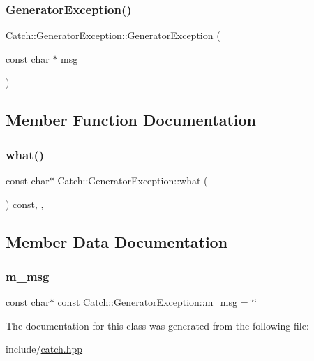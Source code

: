 \subsubsection{\texorpdfstring{GeneratorException()}{GeneratorException()}}
{\footnotesize\ttfamily Catch\+::\+Generator\+Exception\+::\+Generator\+Exception (\begin{DoxyParamCaption}\item[{const char $\ast$}]{msg }\end{DoxyParamCaption})\hspace{0.3cm}{\ttfamily [inline]}}



\subsection{Member Function Documentation}
\mbox{\label{class_catch_1_1_generator_exception_ade029163144d136f12187e5b9a0161d5}} 
\subsubsection{\texorpdfstring{what()}{what()}}
{\footnotesize\ttfamily const char$\ast$ Catch\+::\+Generator\+Exception\+::what (\begin{DoxyParamCaption}{ }\end{DoxyParamCaption}) const\hspace{0.3cm}{\ttfamily [final]}, {\ttfamily [override]}, {\ttfamily [noexcept]}}



\subsection{Member Data Documentation}
\mbox{\label{class_catch_1_1_generator_exception_a493b6ec9e3be0e3852de73c87dba6e5e}} 
\subsubsection{\texorpdfstring{m\_msg}{m\_msg}}
{\footnotesize\ttfamily const char$\ast$ const Catch\+::\+Generator\+Exception\+::m\+\_\+msg = \char`\"{}\char`\"{}\hspace{0.3cm}{\ttfamily [private]}}



The documentation for this class was generated from the following file\+:\begin{DoxyCompactItemize}
\item 
include/\mbox{\hyperlink{catch_8hpp}{catch.\+hpp}}\end{DoxyCompactItemize}
